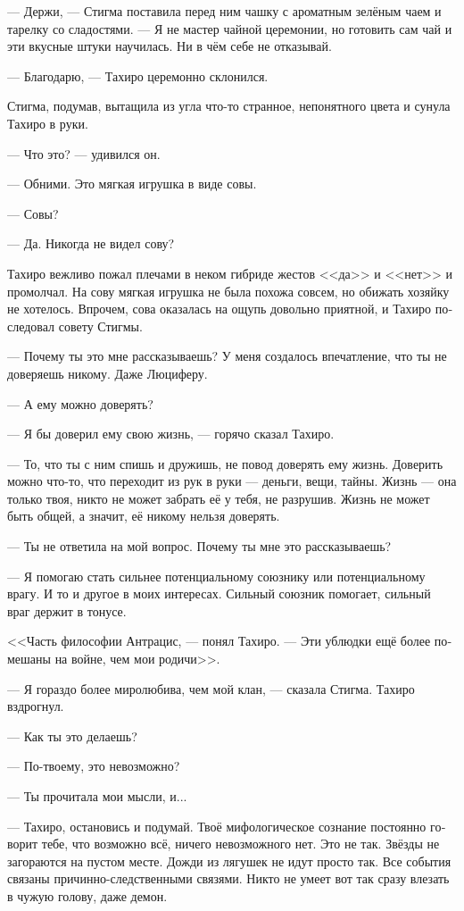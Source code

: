 \documentclass[a4paper,12pt,fleqn]{book}\usepackage{polyglossia}\setdefaultlanguage[babelshorthands=true]{russian}\setotherlanguage{english}\defaultfontfeatures{Ligatures=TeX,Mapping=tex-text}\usepackage{xcolor}\newcommand{\ml}[3]{#2}
\newcommand{\textspace}{\vspace{1em}{\centering\Large\bfseries<...>\par}\vspace{1em}}
\begin{document}
{--- Держи, --- Стигма поставила перед ним чашку с ароматным зелёным чаем и тарелку со сладостями.
--- Я не мастер чайной церемонии, но готовить сам чай и эти вкусные штуки научилась.
Ни в чём себе не отказывай.

--- Благодарю, --- Тахиро церемонно склонился.

Стигма, подумав, вытащила из угла что-то странное, непонятного цвета и сунула Тахиро в руки.

--- Что это? --- удивился он.

--- Обними.
Это мягкая игрушка в виде совы.

--- Совы?

--- Да.
Никогда не видел сову?

Тахиро вежливо пожал плечами в неком гибриде жестов <<да>> и <<нет>> и промолчал.
На сову мягкая игрушка не была похожа совсем, но обижать хозяйку не хотелось.
Впрочем, сова оказалась на ощупь довольно приятной, и Тахиро последовал совету Стигмы.

\textspace

--- Почему ты это мне рассказываешь?
У меня создалось впечатление, что ты не доверяешь никому.
Даже Люциферу.

--- А ему можно доверять?

--- Я бы доверил ему свою жизнь, --- горячо сказал Тахиро.

--- То, что ты с ним спишь и дружишь, не повод доверять ему жизнь.
Доверить можно что-то, что переходит из рук в руки --- деньги, вещи, тайны.
Жизнь --- она только твоя, никто не может забрать её у тебя, не разрушив.
Жизнь не может быть общей, а значит, её никому нельзя доверять.

--- Ты не ответила на мой вопрос.
Почему ты мне это рассказываешь?

--- Я помогаю стать сильнее потенциальному союзнику или потенциальному врагу.
И то и другое в моих интересах.
Сильный союзник помогает, сильный враг держит в тонусе.

<<Часть философии Антрацис, --- понял Тахиро.
--- Эти ублюдки ещё более помешаны на войне, чем мои родичи>>.

--- Я гораздо более миролюбива, чем мой клан, --- сказала Стигма.
Тахиро вздрогнул.

--- Как ты это делаешь?

--- По-твоему, это невозможно?

--- Ты прочитала мои мысли, и...

--- Тахиро, остановись и подумай.
\ml{$0$}
{Твоё мифологическое сознание постоянно говорит тебе, что возможно всё, ничего невозможного нет.}
{Your superstitious thinking always says that all is possible, and nothin' is impossible.}
\ml{$0$}
{Это не так.}
{It's not.}
\ml{$0$}
{Звёзды не загораются на пустом месте.}
{Stars never appear in a vacuum.}
\ml{$0$}
{Дожди из лягушек не идут просто так.}
{Frog rains never fall without a reason.}
\ml{$0$}
{Все события связаны причинно-следственными связями.}
{All events are linked in cause and effect relationships.}
\ml{$0$}
{Никто не умеет вот так сразу влезать в чужую голову, даже демон.}
{And no one can get into your mind like that, not even a daemon.''}

}
\end{document}
